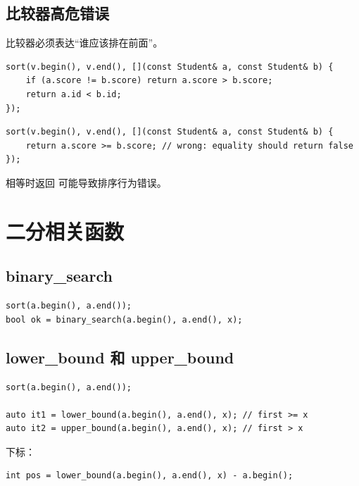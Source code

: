 \subsection{比较器高危错误}

比较器必须表达“谁应该排在前面”。


\begin{lstlisting}
sort(v.begin(), v.end(), [](const Student& a, const Student& b) {
    if (a.score != b.score) return a.score > b.score;
    return a.id < b.id;
});
\end{lstlisting}


\begin{lstlisting}
sort(v.begin(), v.end(), [](const Student& a, const Student& b) {
    return a.score >= b.score; // wrong: equality should return false
});
\end{lstlisting}

相等时返回  可能导致排序行为错误。

\section{二分相关函数}\label{sec:04-16}

\subsection{binary\_search}

\begin{lstlisting}
sort(a.begin(), a.end());
bool ok = binary_search(a.begin(), a.end(), x);
\end{lstlisting}

\subsection{lower\_bound 和 upper\_bound}

\begin{lstlisting}
sort(a.begin(), a.end());

auto it1 = lower_bound(a.begin(), a.end(), x); // first >= x
auto it2 = upper_bound(a.begin(), a.end(), x); // first > x
\end{lstlisting}

下标：

\begin{lstlisting}
int pos = lower_bound(a.begin(), a.end(), x) - a.begin();
\end{lstlisting}

